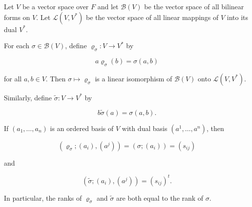 Let $V$ be a vector space over $F$ and let $\mathcal{B}(V)$ be the vector space of all bilinear forms on $V$. Let $\mathcal{L}(V, V^*)$ be the vector space of all linear mappings of $V$ into its dual $V^*$.

For each $\sigma \in \mathcal{B}(V)$, define $\varrho_\sigma: V \to V^*$ by

$$a\varrho_\sigma(b) = \sigma(a, b)$$

for all $a, b \in V$. Then $\sigma \mapsto \varrho_\sigma$ is a linear isomorphism of $\mathcal{B}(V)$ onto $\mathcal{L}(V, V^*)$.

Similarly, define $\tilde{\sigma}: V \to V^*$ by

$$b\tilde{\sigma}(a) = \sigma(a, b).$$

If $(a_1, \ldots, a_n)$ is an ordered basis of $V$ with dual basis $(a^1, \ldots, a^n)$, then

$$(\varrho_\sigma; (a_i), (a^j)) = (\sigma; (a_i)) = (s_{ij})$$

and

$$(\tilde{\sigma}; (a_i), (a^j)) = (s_{ij})^t.$$

In particular, the ranks of $\varrho_\sigma$ and $\tilde{\sigma}$ are both equal to the rank of $\sigma$.
